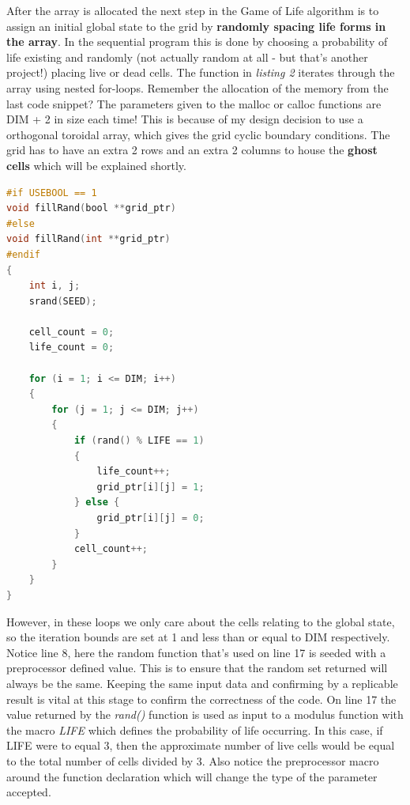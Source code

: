 \documentclass[11pt]{article} %
\begin{document}
\bigskip
After the array is allocated the next step in the Game of Life algorithm is to assign an initial global state to the grid by {\bf randomly spacing life forms in the array}. In the sequential program this is done by choosing a probability of life existing and randomly (not actually random at all - but that's another project!) placing live or dead cells. The function in {\it listing 2} iterates through the array using nested for-loops. Remember the allocation of the memory from the last code snippet? The parameters given to the malloc or calloc functions are DIM + 2 in size each time! This is because of my design decision to use a orthogonal toroidal array, which gives the grid cyclic boundary conditions. The grid has to have an extra 2 rows and an extra 2 columns to house the {\bf ghost cells} which will be explained shortly.
\begin{lstlisting}[language=C,caption={Randomly spacing lifeforms in the array}, morekeywords={malloc,calloc,bool}]
#if USEBOOL == 1
void fillRand(bool **grid_ptr)
#else
void fillRand(int **grid_ptr)
#endif
{
	int i, j;
	srand(SEED);

	cell_count = 0;
	life_count = 0;

	for (i = 1; i <= DIM; i++)
	{
		for (j = 1; j <= DIM; j++)
		{
			if (rand() % LIFE == 1)
			{
				life_count++;
				grid_ptr[i][j] = 1;
			} else {
				grid_ptr[i][j] = 0;
			}
			cell_count++;
		}
	}
}
\end{lstlisting}
However, in these loops we only care about the cells relating to the global state, so the iteration bounds are set at 1 and less than or equal to DIM respectively. Notice line 8, here the random function that's used on line 17 is seeded with a preprocessor defined value. This is to ensure that the random set returned will always be the same. Keeping the same input data and confirming by a replicable result is vital at this stage to confirm the correctness of the code. On line 17 the value returned by the {\it rand()} function is used as input to a modulus function with the macro {\it LIFE} which defines the probability of life occurring. In this case, if LIFE were to equal 3, then the approximate number of live cells would be equal to the total number of cells divided by 3. Also notice the preprocessor macro around the function declaration which will change the type of the parameter accepted.\\\\
\end{document}
